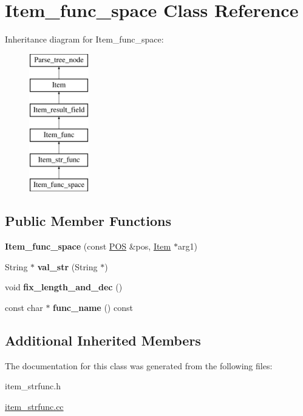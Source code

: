 \hypertarget{classItem__func__space}{}\section{Item\+\_\+func\+\_\+space Class Reference}
\label{classItem__func__space}
Inheritance diagram for Item\+\_\+func\+\_\+space\+:\begin{figure}[H]
\begin{center}
\leavevmode
\includegraphics[height=6.000000cm]{classItem__func__space}
\end{center}
\end{figure}
\subsection*{Public Member Functions}
\begin{DoxyCompactItemize}
\item 
\mbox{\label{classItem__func__space_ad710879c052674c1d00e04451595d50b}} 
{\bfseries Item\+\_\+func\+\_\+space} (const \mbox{\hyperlink{structYYLTYPE}{P\+OS}} \&pos, \mbox{\hyperlink{classItem}{Item}} $\ast$arg1)
\item 
\mbox{\label{classItem__func__space_a38fca1a06286849b677a21545c9c5ce2}} 
String $\ast$ {\bfseries val\+\_\+str} (String $\ast$)
\item 
\mbox{\label{classItem__func__space_a73752752c424d8d222425960c98c5f08}} 
void {\bfseries fix\+\_\+length\+\_\+and\+\_\+dec} ()
\item 
\mbox{\label{classItem__func__space_a0f849bd79dc838c942986933d6f631da}} 
const char $\ast$ {\bfseries func\+\_\+name} () const
\end{DoxyCompactItemize}
\subsection*{Additional Inherited Members}


The documentation for this class was generated from the following files\+:\begin{DoxyCompactItemize}
\item 
item\+\_\+strfunc.\+h\item 
\mbox{\hyperlink{item__strfunc_8cc}{item\+\_\+strfunc.\+cc}}\end{DoxyCompactItemize}
